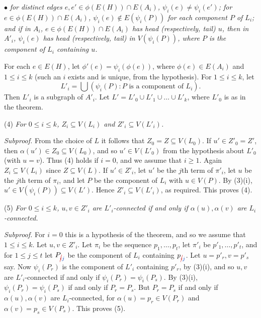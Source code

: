\hspace*{12pt}$\bullet$ \textit{for distinct edges $e, e' \in \phi(E(H)) \cap E(A_i)$, $\psi_i(e) \ne \psi_i(e')$; for $e \in \phi(E(H)) \cap E(A_i)$, $\psi_i(e) \notin E(\psi_i(P))$ for each component $P$ of $L_i$; and if in $A_i$, $e \in \phi(E(H)) \cap E(A_i)$ has head (respectively, tail) $u$, then in $A'_i$, $\psi_i(e)$ has head (respectively, tail) in $V(\psi_i(P))$, where $P$ is the component of $L_i$ containing $u$.}

For each $e \in E(H)$, let $\phi'(e) = \psi_i(\phi(e))$, where $\phi(e) \in E(A_i)$ and $1 \le i \le k$ (such an $i$ exists and is unique, from the hypothesis). For $1 \le i \le k$, let
\begin{equation*}
L'_i = \bigcup(\psi_i(P) : \text{$P$ is a component of $L_i$}).
\end{equation*}
Then $L'_i$ is a subgraph of $A'_i$. Let $L' = L'_0 \cup L'_1 \cup \dots \cup L'_k$, where $L'_0$ is as in the theorem.

\hspace*{12pt}(4) \textit{For $0 \le i \le k$, $Z_i \subseteq V(L_i)$ and $Z'_i \subseteq V(L'_i)$.}

\textit{Subproof.} From the choice of $L$ it follows that $Z_0 = Z \subseteq V(L_0)$. If $u' \in Z'_0 = Z'$, then $\alpha(u') \in Z_0 \subseteq V(L_0)$, and so $u' \in V(L'_0)$ from the hypothesis about $L'_0$ (with $u = v$). Thus (4) holds if $i = 0$, and we assume that $i \ge 1$. Again $Z_i \subseteq V(L_i)$ since $Z \subseteq V(L)$. If $u' \in Z'_i$, let $u'$ be the $j$th term of $\pi'_i$, let $u$ be the $j$th term of $\pi_i$, and let $P$ be the component of $L_i$ with $u \in V(P)$. By (3)(i), $u' \in V(\psi_i(P)) \subseteq V(L')$. Hence $Z'_i \subseteq V(L'_i)$, as required. This proves (4).

\hspace*{12pt}(5) \textit{For $0 \le i \le k$, $u, v \in Z'_i$ are $L'_i$-connected if and only if $\alpha(u), \alpha(v)$ are $L_i$-connected.}

\textit{Subproof.} For $i = 0$ this is a hypothesis of the theorem, and so we assume that $1 \le i \le k$. Let $u, v \in Z'_i$. Let $\pi_i$ be the sequence $p_1, \ldots, p_t$, let $\pi'_i$ be $p'_1, \ldots, p'_t$, and for $1 \le j \le t$ let $P_{\delm{i}\fix{j}}$ be the component of $L_i$ containing $p_{\delm{i}\fix{j}}$. Let $u = p'_r, v = p'_s$ say. Now $\psi_i(P_r)$ is the component of $L'_i$ containing $p'_r$, by (3)(i), and so $u, v$ are $L'_i$-connected if and only if $\psi_i(P_r) = \psi_i(P_s)$. By (3)(i), $\psi_i(P_r) = \psi_i(P_s)$ if and only if $P_r = P_s$. But $P_r = P_s$ if and only if $\alpha(u), \alpha(v)$ are $L_i$-connected, for $\alpha(u) = p_r \in V(P_r)$ and $\alpha(v) = p_s \in V(P_s)$. This proves (5).

